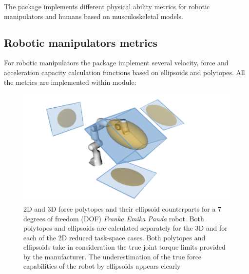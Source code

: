 The package implements different physical ability metrics for robotic manipulators and humans based on musculoskeletal models.

\subsection{Robotic manipulators metrics}
\label{sec:pycapacity_robot}

For robotic manipulators the package implement several velocity, force and acceleration capacity calculation functions based on ellipsoids and polytopes. All the metrics are implemented within  module:

\begin{figure}[!h]
    \centering
    \includegraphics[width=0.7\linewidth]{Papers/images/polytope_ellipsoid.png}
    \caption{2D and 3D force polytopes and their ellipsoid counterparts for a 7 degrees of freedom (DOF) \textit{Franka Emika Panda} robot. Both polytopes and ellipsoids are calculated separately for the 3D and for each of the 2D reduced task-space cases. Both polytopes and ellipsoids take in consideration the true joint torque limits provided by the manufacturer. The underestimation of the true force capabilities of the robot by ellipsoids appears clearly}
    \label{fig:force_polytope_robot_ellip_revisit}
\end{figure}



